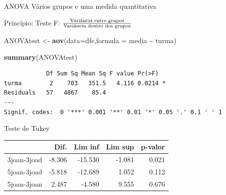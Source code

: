 \documentclass[
  9pt,
  ignorenonframetext,
  aspectratio=169]{beamer}
\newenvironment{Shaded}{\begin{snugshade}}{\end{snugshade}}
\newcommand{\CharTok}[1]{\textcolor[rgb]{0.31,0.60,0.02}{#1}}
\newcommand{\DataTypeTok}[1]{\textcolor[rgb]{0.13,0.29,0.53}{#1}}
\newcommand{\DecValTok}[1]{\textcolor[rgb]{0.00,0.00,0.81}{#1}}
\newcommand{\KeywordTok}[1]{\textcolor[rgb]{0.13,0.29,0.53}{\textbf{#1}}}
\newcommand{\NormalTok}[1]{#1}
\newcommand{\OperatorTok}[1]{\textcolor[rgb]{0.81,0.36,0.00}{\textbf{#1}}}
\newcommand{\StringTok}[1]{\textcolor[rgb]{0.31,0.60,0.02}{#1}}
\begin{document}
\begin{frame}[fragile]{ANOVA}
\protect\hypertarget{anova}{}
Vários grupos e uma medida quantitativa

Princípio: Teste F:
\(\Huge\frac{\text{Variância entre grupos}}{\text{Variância dentro dos grupos}}\)

\begin{Shaded}
\begin{Highlighting}[]
\NormalTok{ANOVAtest \textless{}{-}}\StringTok{ }\KeywordTok{aov}\NormalTok{(}\DataTypeTok{data=}\NormalTok{dfe,}\DataTypeTok{formula =}\NormalTok{ media }\OperatorTok{\textasciitilde{}}\StringTok{ }\NormalTok{turma)}

\KeywordTok{summary}\NormalTok{(ANOVAtest)}
\end{Highlighting}
\end{Shaded}

\begin{verbatim}
            Df Sum Sq Mean Sq F value Pr(>F)  
turma        2    703   351.5   4.116 0.0214 *
Residuals   57   4867    85.4                 
---
Signif. codes:  0 '***' 0.001 '**' 0.01 '*' 0.05 '.' 0.1 ' ' 1
\end{verbatim}
\end{frame}

\begin{frame}[fragile]{Teste de Tukey}
\protect\hypertarget{teste-de-tukey}{}
\begin{Shaded}
\end{Shaded}

\begin{tabular}{l|r|r|r|r}
\hline
 & Dif. & Lim inf & Lim sup & p-valor\\
\hline
3joan-3joad & -8.306 & -15.530 & -1.081 & 0.021\\
\hline
5joan-3joad & -5.818 & -12.689 & 1.052 & 0.112\\
\hline
5joan-3joan & 2.487 & -4.580 & 9.555 & 0.676\\
\hline
\end{tabular}
\end{frame}
\end{document}
